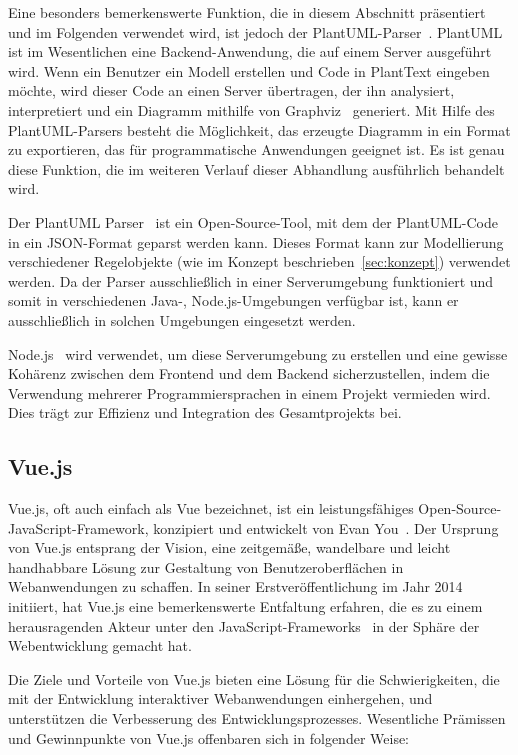 Eine besonders bemerkenswerte Funktion, die in diesem Abschnitt präsentiert und im Folgenden verwendet wird, ist jedoch
der PlantUML-Parser~\cite{plantUMLParser}. PlantUML ist im Wesentlichen eine Backend-Anwendung, die auf einem Server
ausgeführt wird. Wenn ein Benutzer ein Modell erstellen und Code in PlantText eingeben möchte, wird dieser Code an einen Server
übertragen, der ihn analysiert, interpretiert und ein Diagramm mithilfe von Graphviz~\cite{graphViz} generiert. Mit
Hilfe des PlantUML-Parsers besteht die Möglichkeit, das erzeugte Diagramm in ein Format zu exportieren, das für
programmatische Anwendungen geeignet ist. Es ist genau diese Funktion, die im weiteren Verlauf dieser Abhandlung
ausführlich behandelt wird.

Der PlantUML Parser~\cite{plantUMLParser} ist ein Open-Source-Tool,
mit dem der PlantUML-Code in ein JSON-Format geparst werden kann. Dieses Format kann zur Modellierung verschiedener
Regelobjekte (wie im Konzept beschrieben~\ref{sec:konzept}) verwendet werden. Da der Parser ausschließlich in einer
Serverumgebung funktioniert und somit in verschiedenen Java-, Node.js-Umgebungen verfügbar ist, kann er
ausschließlich in solchen Umgebungen eingesetzt werden.

Node.js~\cite{Node} wird verwendet, um diese Serverumgebung zu erstellen und eine gewisse Kohärenz zwischen dem
Frontend und dem Backend sicherzustellen, indem die Verwendung mehrerer Programmiersprachen in einem Projekt vermieden
wird. Dies trägt zur Effizienz und Integration des Gesamtprojekts bei.

\subsection{Vue.js}

Vue.js, oft auch einfach als Vue bezeichnet, ist  ein leistungsfähiges Open-Source-JavaScript-Framework, konzipiert und
entwickelt von Evan You~\cite{vue}. Der Ursprung von Vue.js entsprang der Vision, eine zeitgemäße, wandelbare und leicht
handhabbare Lösung zur Gestaltung von Benutzeroberflächen in Webanwendungen zu schaffen. In seiner Erstveröffentlichung
im Jahr 2014 initiiert, hat Vue.js eine bemerkenswerte Entfaltung erfahren, die es zu einem herausragenden Akteur unter
den JavaScript-Frameworks~\cite{levlin2020dom} in der Sphäre der Webentwicklung gemacht hat.

Die Ziele und Vorteile von Vue.js bieten eine Lösung für die Schwierigkeiten, die mit der Entwicklung interaktiver
Webanwendungen einhergehen, und unterstützen die Verbesserung des Entwicklungsprozesses. Wesentliche
Prämissen und Gewinnpunkte von Vue.js offenbaren sich in folgender Weise:

